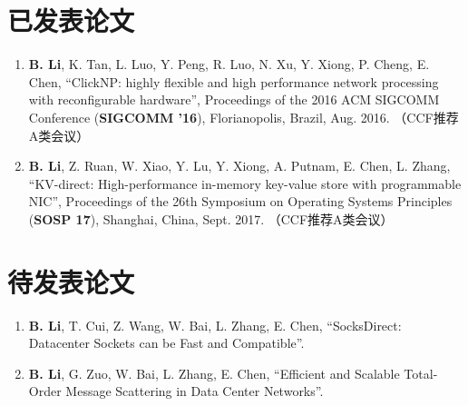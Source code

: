 
\begin{publications}

\section*{已发表论文}

\begin{enumerate}
\item \textbf{B. Li}, K. Tan, L. Luo, Y. Peng, R. Luo, N. Xu, Y. Xiong, P. Cheng, E. Chen, ``ClickNP: highly flexible and high performance network processing with reconfigurable hardware'', Proceedings of the 2016 ACM SIGCOMM Conference (\textbf{SIGCOMM '16}), Florianopolis, Brazil, Aug. 2016. （CCF推荐A类会议）
\item \textbf{B. Li}, Z. Ruan, W. Xiao, Y. Lu, Y. Xiong, A. Putnam, E. Chen, L. Zhang, ``KV-direct: High-performance in-memory key-value store with programmable NIC'', Proceedings of the 26th Symposium on Operating Systems Principles (\textbf{SOSP 17}), Shanghai, China, Sept. 2017. （CCF推荐A类会议）
\end{enumerate}

\section*{待发表论文}

\begin{enumerate}
\item \textbf{B. Li}, T. Cui, Z. Wang, W. Bai, L. Zhang, E. Chen, ``SocksDirect: Datacenter Sockets can be Fast and Compatible''.
\item \textbf{B. Li}, G. Zuo, W. Bai, L. Zhang, E. Chen, ``Efficient and Scalable Total-Order Message Scattering in Data Center Networks''.
\end{enumerate}


\end{publications}
